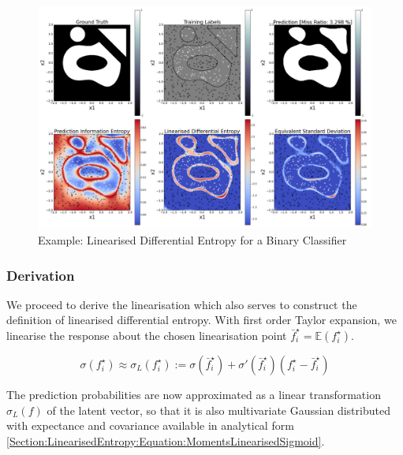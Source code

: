 \documentclass{article}
\begin{document}
		\begin{figure}[tb]
		\centering
			\includegraphics[width = \linewidth]{Figures/binary_linearised_entropy/Figure1.png}
		\caption{Example: Linearised Differential Entropy for a Binary Classifier}
		\label{Figure:Results:BinaryLinearisedEntropy}
		\end{figure}
		
		\subsubsection{Derivation}
		
			We proceed to derive the linearisation which also serves to construct the definition of linearised differential entropy. With first order Taylor expansion, we linearise the response about the chosen linearisation point $\bar{f}^{\star}_{i} = \mathbb{E}(f^{\star}_{i})$.
			
			\begin{equation}
				\sigma(f^{\star}_{i}) \approx \sigma_{L}(f^{\star}_{i}) := \sigma(\bar{f}^{\star}_{i}) + \sigma'(\bar{f}^{\star}_{i}) (f^{\star}_{i} - \bar{f}^{\star}_{i})
			\label{Section:LinearisedEntropy:Equation:LinearisingSigmoid}
			\end{equation}
			
			The prediction probabilities are now approximated as a linear transformation $\sigma_{L}(f)$ of the latent vector, so that it is also multivariate Gaussian distributed with expectance and covariance available in analytical form \eqref{Section:LinearisedEntropy:Equation:MomentsLinearisedSigmoid}.
			
\end{document}
